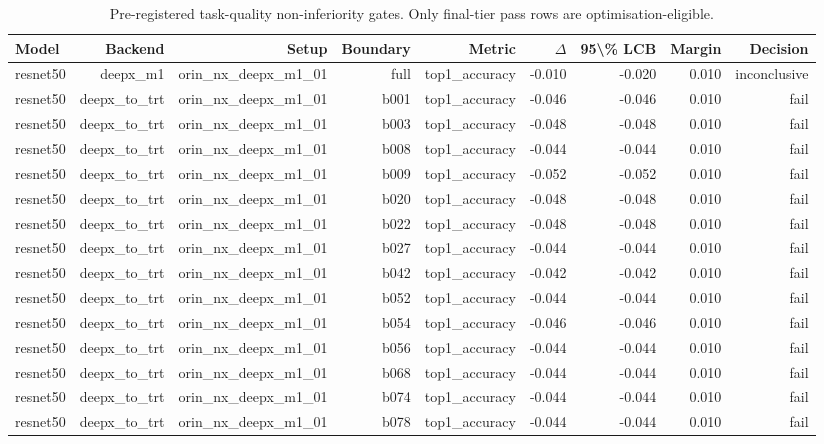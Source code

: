 \begin{table}[t]
\centering
\small
\caption{Pre-registered task-quality non-inferiority gates. Only final-tier pass rows are optimisation-eligible.}
\label{tab:task-quality-gates}
\begin{tabular}{lrrrrrrrr}
\toprule
Model & Backend & Setup & Boundary & Metric & $\Delta$ & 95\textbackslash{}\% LCB & Margin & Decision \\
\midrule
resnet50 & deepx\_m1 & orin\_nx\_deepx\_m1\_01 & full & top1\_accuracy & -0.010 & -0.020 & 0.010 & inconclusive \\
resnet50 & deepx\_to\_trt & orin\_nx\_deepx\_m1\_01 & b001 & top1\_accuracy & -0.046 & -0.046 & 0.010 & fail \\
resnet50 & deepx\_to\_trt & orin\_nx\_deepx\_m1\_01 & b003 & top1\_accuracy & -0.048 & -0.048 & 0.010 & fail \\
resnet50 & deepx\_to\_trt & orin\_nx\_deepx\_m1\_01 & b008 & top1\_accuracy & -0.044 & -0.044 & 0.010 & fail \\
resnet50 & deepx\_to\_trt & orin\_nx\_deepx\_m1\_01 & b009 & top1\_accuracy & -0.052 & -0.052 & 0.010 & fail \\
resnet50 & deepx\_to\_trt & orin\_nx\_deepx\_m1\_01 & b020 & top1\_accuracy & -0.048 & -0.048 & 0.010 & fail \\
resnet50 & deepx\_to\_trt & orin\_nx\_deepx\_m1\_01 & b022 & top1\_accuracy & -0.048 & -0.048 & 0.010 & fail \\
resnet50 & deepx\_to\_trt & orin\_nx\_deepx\_m1\_01 & b027 & top1\_accuracy & -0.044 & -0.044 & 0.010 & fail \\
resnet50 & deepx\_to\_trt & orin\_nx\_deepx\_m1\_01 & b042 & top1\_accuracy & -0.042 & -0.042 & 0.010 & fail \\
resnet50 & deepx\_to\_trt & orin\_nx\_deepx\_m1\_01 & b052 & top1\_accuracy & -0.044 & -0.044 & 0.010 & fail \\
resnet50 & deepx\_to\_trt & orin\_nx\_deepx\_m1\_01 & b054 & top1\_accuracy & -0.046 & -0.046 & 0.010 & fail \\
resnet50 & deepx\_to\_trt & orin\_nx\_deepx\_m1\_01 & b056 & top1\_accuracy & -0.044 & -0.044 & 0.010 & fail \\
resnet50 & deepx\_to\_trt & orin\_nx\_deepx\_m1\_01 & b068 & top1\_accuracy & -0.044 & -0.044 & 0.010 & fail \\
resnet50 & deepx\_to\_trt & orin\_nx\_deepx\_m1\_01 & b074 & top1\_accuracy & -0.044 & -0.044 & 0.010 & fail \\
resnet50 & deepx\_to\_trt & orin\_nx\_deepx\_m1\_01 & b078 & top1\_accuracy & -0.044 & -0.044 & 0.010 & fail \\

\end{tabular}
\end{table}
